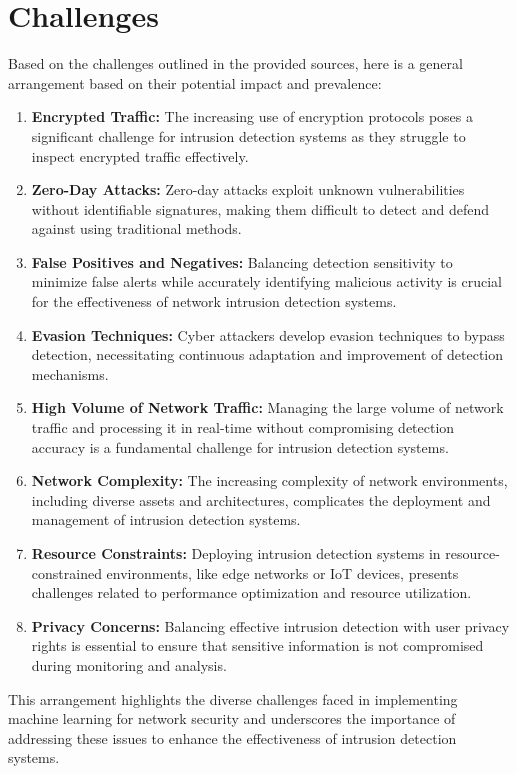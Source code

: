 \section{Challenges}
Based on the challenges outlined in the provided sources, here is a general arrangement based on their potential impact and prevalence:

\begin{enumerate}
    \item \textbf{Encrypted Traffic:} The increasing use of encryption protocols poses a significant challenge for intrusion detection systems as they struggle to inspect encrypted traffic effectively.
    \item \textbf{Zero-Day Attacks:} Zero-day attacks exploit unknown vulnerabilities without identifiable signatures, making them difficult to detect and defend against using traditional methods.
    \item \textbf{False Positives and Negatives:} Balancing detection sensitivity to minimize false alerts while accurately identifying malicious activity is crucial for the effectiveness of network intrusion detection systems.
    \item \textbf{Evasion Techniques:} Cyber attackers develop evasion techniques to bypass detection, necessitating continuous adaptation and improvement of detection mechanisms.
    \item \textbf{High Volume of Network Traffic:} Managing the large volume of network traffic and processing it in real-time without compromising detection accuracy is a fundamental challenge for intrusion detection systems.
    \item \textbf{Network Complexity:} The increasing complexity of network environments, including diverse assets and architectures, complicates the deployment and management of intrusion detection systems.
    \item \textbf{Resource Constraints:} Deploying intrusion detection systems in resource-constrained environments, like edge networks or IoT devices, presents challenges related to performance optimization and resource utilization.
    \item \textbf{Privacy Concerns:} Balancing effective intrusion detection with user privacy rights is essential to ensure that sensitive information is not compromised during monitoring and analysis.
\end{enumerate}

This arrangement highlights the diverse challenges faced in implementing machine learning for network security and underscores the importance of addressing these issues to enhance the effectiveness of intrusion detection systems.


